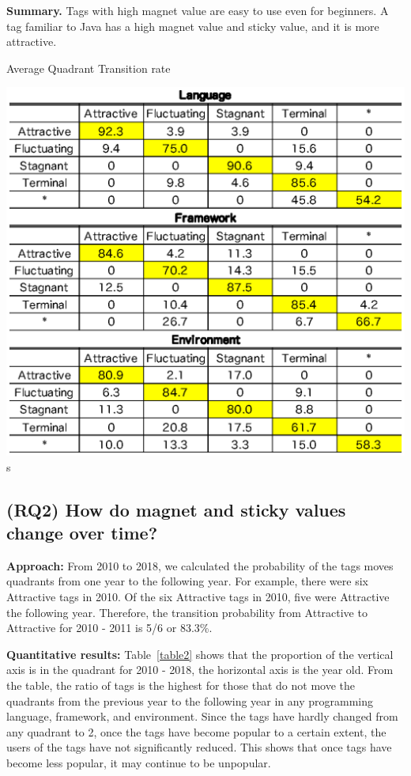 \documentclass[english,preprint,JIP,technote]{ipsj}
\begin{document}
\noindent \textbf{Summary.}
 Tags with high magnet value are easy to use even for beginners. A tag familiar to Java has a high magnet value and sticky value, and it is more attractive.

\begin{table}[t]
 \centering
 \caption{Average Quadrant Transition rate}
 \includegraphics[width=1.0\hsize]{img/averageAFST.eps} s
 \label{table2} 
\end{table}

\subsection{(RQ2) How do magnet and sticky values change over time?} 

\noindent \textbf{Approach:}
From 2010 to 2018, we calculated the probability of the tags moves quadrants from one year to the following year. For example, there were six Attractive tags in 2010. Of the six Attractive tags in 2010, five were Attractive the following year. Therefore, the transition probability from Attractive to Attractive for 2010 - 2011 is 5/6 or 83.3\%. 

\noindent \textbf{Quantitative results:}
Table~\ref{table2} shows that the proportion of the vertical axis is in the quadrant for 2010 - 2018, the horizontal axis is the year old. From the table, the ratio of tags is the highest for those that do not move the quadrants from the previous year to the following year in any programming language, framework, and environment. Since the tags have hardly changed from any quadrant to 2, once the tags have become popular to a certain extent, the users of the tags have not significantly reduced. This shows that once tags have become less popular, it may continue to be unpopular.
\end{document}
